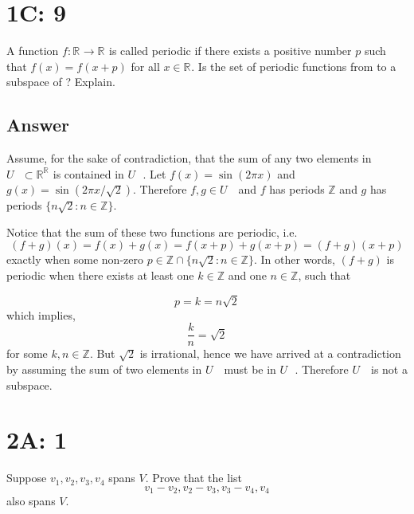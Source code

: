 \documentclass[
	12pt, %
]{fphw}
\newcommand\set[1]{\{#1\}}
\newcommand\R[1]{\text{$\mathbb{R}^{#1}$}}
\newcommand\Z{\text{$\mathbb{Z}$}}
\newcommand\U{\text{$U$ }}
\begin{document}
\newpage

\section*{1C: 9}

\begin{problem}
A function $f : \R{} \to \R{}$ is called periodic if there exists a positive number $p$ such that $f(x) = f(x + p)$ for all $x \in \R{}$. Is the set of periodic functions from \R{} to \R{} a subspace of \R{\R{}}? Explain.\end{problem}


\subsection*{Answer} Assume, for the sake of contradiction, that the sum of any two elements in $\U \subset \R{\R{}}$ is contained in $\U$. Let $f(x) = \sin(2\pi x)$ and $g(x) = \sin(2\pi x / \sqrt{2})$.  Therefore $f, g \in \U$ and $f$ has periods $\Z$ and $g$ has periods $\set{n\sqrt{2} : n \in \Z}$. 

Notice that the sum of these two functions are periodic, i.e. 
$$(f+g)(x) = f(x) + g(x) = f(x + p) + g(x + p) = (f+g)(x + p)$$
exactly when some non-zero $p \in \Z \cap \set{n\sqrt{2} : n \in \Z}$. In other words, $(f+g)$ is periodic when there exists at least one $k \in \Z$ and one $n \in \Z$, such that 

$$
p = k = n \sqrt{2}
$$
which implies,
$$\frac{k}{n} = \sqrt{2}$$
for some $k, n \in \Z$. But $\sqrt{2}$ is irrational, hence we have arrived at a contradiction by assuming the sum of two elements in $\U$ must be in $\U$. Therefore $\U$ is not a subspace.


\newpage
\section*{2A: 1}

\begin{problem}
Suppose $v_1, v_2,  v_3, v_4$ spans $V$. Prove that the list
$$v_1-v_2, v_2 - v_3, v_3-v_4, v_4$$
also spans $V$.

\end{problem}

\end{document}
